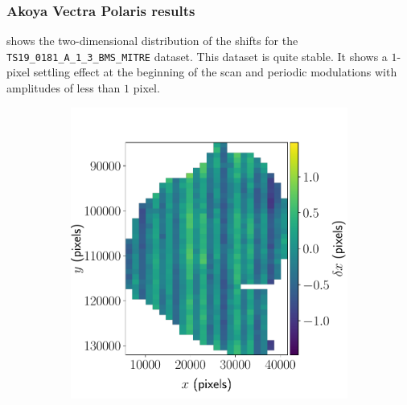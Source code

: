 \documentclass{article}
\begin{document}
\subsubsection{Akoya Vectra Polaris results}
\label{sec:AKY2D}

 shows the two-dimensional distribution of the shifts for the \texttt{TS19\_0181\_A\_1\_3\_BMS\_MITRE} dataset.  This dataset is quite stable.   It shows a $1$-pixel settling effect at the beginning of the scan and periodic modulations with amplitudes of less than $1$ pixel.

\begin{figure}[ht]
	\centering
	\begin{subfigure}{0.49\linewidth}
		\includegraphics[width=\linewidth]{2D-shifts-AKY-x}
		\caption{}
		\label{fig:2DAKYx}
	\end{subfigure}
	\begin{subfigure}{0.49\linewidth}

\end{subfigure}
\end{figure}
\end{document}
